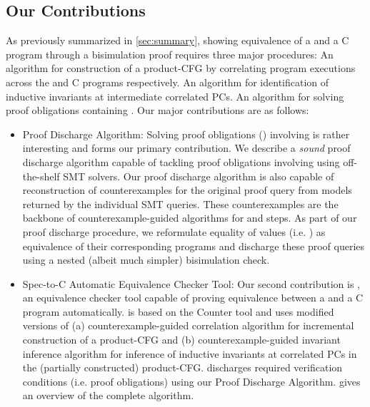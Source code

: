 \subsection{Our Contributions}
\label{sec:contribs}
As previously summarized in \cref{sec:summary}, showing equivalence of a \SpecL{} and a C program
through a bisimulation proof requires three major procedures:
 An algorithm for construction of a product-CFG by correlating program executions
across the \SpecL{} and C programs respectively.
 An algorithm for identification of inductive invariants at intermediate correlated PCs.
 An algorithm for solving proof obligations containing \recursiveRelations{}.
Our major contributions are as follows:

\begin{itemize}
\item Proof Discharge Algorithm: Solving proof obligations ()
involving \recursiveRelations{} is rather interesting and forms our primary contribution.
We describe a {\em sound} proof discharge algorithm capable of tackling proof obligations involving
\recursiveRelations{} using off-the-shelf SMT solvers. Our proof discharge algorithm is also capable of
reconstruction of counterexamples for the original proof query from models returned by the individual SMT queries.
These counterexamples are the backbone of counterexample-guided algorithms for
 and  steps. As part of our proof discharge procedure,
we reformulate equality of values (i.e. \recursiveRelations{}) as equivalence of their corresponding programs
and discharge these proof queries using a nested (albeit much simpler) bisimulation check.

\item Spec-to-C Automatic Equivalence Checker Tool: Our second contribution is \toolName{}, an equivalence checker tool
capable of proving equivalence between a \SpecL{} and a C program automatically.
\toolName{} is based on
the Counter tool\cite{oopsla20} and uses modified versions of (a) counterexample-guided correlation algorithm for
incremental construction of a product-CFG and (b) counterexample-guided invariant inference algorithm
for inference of inductive invariants at correlated PCs in the (partially constructed) product-CFG.
\toolName{} discharges required verification conditions (i.e. proof obligations) using our Proof Discharge Algorithm.
 gives an overview of the complete algorithm.
\end{itemize}

